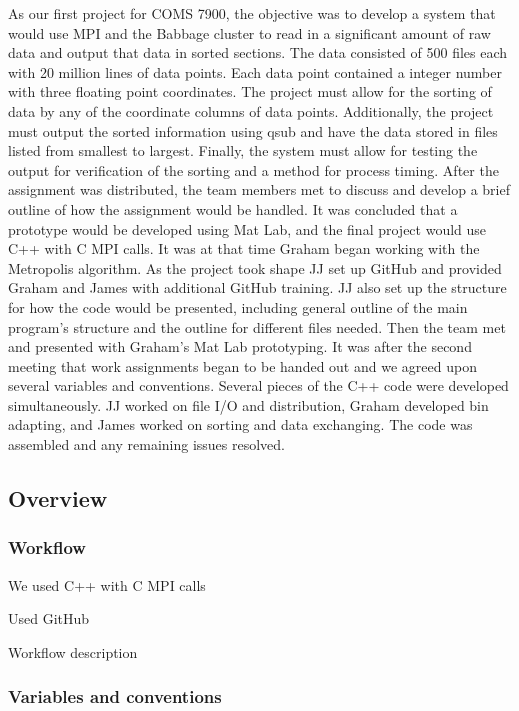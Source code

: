 \documentclass{article}
\begin{document}
As our first project for COMS 7900, the objective was to develop a system that would use MPI and the Babbage cluster to read in a significant amount of raw data and output that data in sorted sections. The data consisted of 500 files each with 20 million lines of data points. Each data point contained a integer number with three floating point coordinates. The project must allow for the sorting of data by any of the coordinate columns of data points. Additionally, the project must output the sorted information using qsub and have the data stored in files listed from smallest to largest. Finally, the system must allow for testing the output for verification of the sorting and a method for process timing. After the assignment was distributed, the team members met to discuss and develop a brief outline of how the assignment would be handled. It was concluded that a prototype would be developed using Mat Lab, and the final project would use C++ with C MPI calls. It was at that time Graham began working with the Metropolis algorithm. As the project took shape JJ set up GitHub and provided Graham and James with additional GitHub training. JJ also set up the structure for how the code would be presented, including general outline of the main program's structure and the outline for different files needed. Then the team met and presented with Graham's Mat Lab prototyping. It was after the second meeting that work assignments began to be handed out and we agreed upon several variables and conventions. Several pieces of the C++ code were developed simultaneously. JJ worked on file I/O and distribution, Graham developed bin adapting, and James worked on sorting and data exchanging. The code was assembled and any remaining issues resolved. 




\subsection{Overview}


\subsubsection{Workflow}
We used C++ with C MPI calls

Used GitHub

Workflow description


\subsubsection{Variables and conventions}
\end{document}
